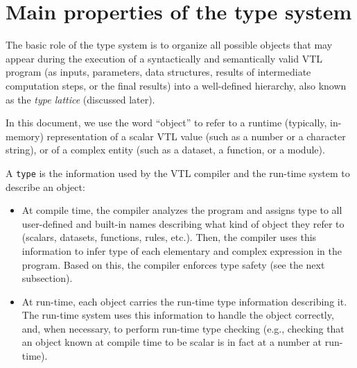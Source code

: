 \documentclass[droidmono,libertine,twoside,user,unofficial]{ecarticle}
\begin{document}
\section{Main properties of the type system}

The basic role of the type system is to organize all possible objects
that may appear during the execution of a syntactically and
semantically valid VTL program (as inputs, parameters, data
structures, results of intermediate computation steps, or the final
results) into a well-defined hierarchy, also known as the \emph{type
  lattice} (discussed later).

In this document, we use the word ``object'' to refer to a runtime
(typically, in-memory) representation of a scalar VTL value (such as a
number or a character string), or of a complex entity (such as a
dataset, a function, or a module).

A \texttt{type} is the information used by the VTL compiler and the
run-time system to describe an object:
\begin{itemize}
\item At compile time, the compiler analyzes the program and assigns
  type to all user-defined and built-in names describing what kind of
  object they refer to (scalars, datasets, functions, rules, etc.).
  Then, the compiler uses this information to infer type of each
  elementary and complex expression in the program.  Based on this,
  the compiler enforces type safety (see the next subsection).
  
\item At run-time, each object carries the run-time type information
  describing it.  The run-time system uses this information to handle
  the object correctly, and, when necessary, to perform run-time type
  checking (e.g., checking that an object known at compile time to be
  scalar is in fact at a number at run-time). 
\end{itemize}
\end{document}
